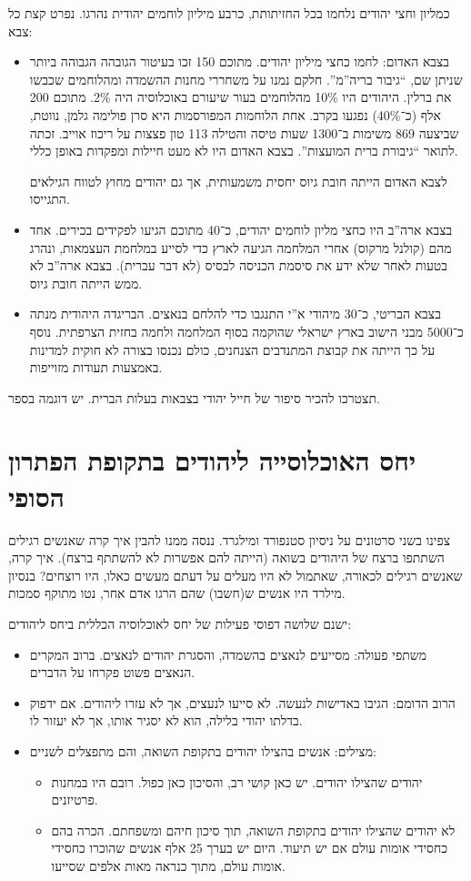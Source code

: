 \documentclass[a4paper]{book}
\begin{document}
	כמליון וחצי יהודים נלחמו בכל החזיתותת, כרבע מיליון לוחמים יהודית נהרגו. נפרט קצת כל צבא: 
	\begin{itemize}
		\item בצבא האדום: לחמו כחצי מיליון יהודים. מתוכם 150 זכו בעיטור הגובהה הגבוהה ביותר שניתן שם, ``גיבור בריה''מ''. חלקם נמנו על משחררי מחנות ההשמדה ומהלוחמים שכבשו את ברלין. היהודים היו 10\% מהלוחמים בעור שיעורם באוכלוסיה היה 2\%. מתוכם 200 אלף (כ־40\%) נפגעו בקרב. אחת הלוחמות המפורסמות היא סרן פולימה גלמן, נווטת, שביצעה 869 משימות ב־1300 שעות טיסה והטילה 113 טון פצצות על ריכוז אוייב. זכתה לתואר ``גיבורת ברית המועצות''. בצבא האדום היו לא מעט חיילות ומפקדות באופן כללי. 
		
		לצבא האדום הייתה חובת גיוס יחסית משמעותית, אך גם יהודים מחוץ לטווח הגילאים התגייסו. 
		
		\item בצבא ארה''ב היו כחצי מליון לוחמים יהודים, כ־40 מתוכם הגיעו לפקידים בכירים. אחד מהם (קולנל מרקוס) אחרי המלחמה הגיעה לארץ כדי לסייע במלחמת העצמאות, ונהרג בטעות לאחר שלא ידע את סיסמת הכניסה לבסיס (לא דבר עברית). בצבא ארה''ב לא ממש הייתה חובת גיוס. 
		\item בצבא הבריטי, כ־30 מיהודי א''י התנגבו כדי להלחם בנאצים. הבריגדה היהודית מנתה כ־5000 מבני הישוב בארץ ישראלי שהוקמה בסוף המלחמה ולחמה בחזית הצרפתית. נוסף על כך הייתה את קבוצת המתנדבים הצנחנים, כולם נכנסו בצורה לא חוקית למדינות באמצעות תעודות מזוייפות. 
	\end{itemize}
	
	תצטרכו להכיר סיפור של חייל יהודי בצבאות בעלות הברית. יש דוגמה בספר. 
	
	\section{יחס האוכלוסייה ליהודים בתקופת הפתרון הסופי}
	צפינו בשני סרטונים על ניסיון סטנפורד ומילגרד. ננסה ממנו להבין איך קרה שאנשים רגילים השתתפו ברצח של היהודים בשואה (הייתה להם אפשרות לא להשתתף ברצח). איך קרה, שאנשים רגילים לכאורה, שאתמול לא היו מעלים על דעתם מעשים כאלו, היו רוצחים? בנסיון מילרד היו אנשים ש(חשבו) שהם הרגו אדם אחר, נטו מתוקף סמכות. 
	
	ישנם שלושה דפוסי פעילות של יחס לאוכלוסיה הכללית ביחס ליהודים: 
	\begin{itemize}
		\item משתפי פעולה: מסייעים לנאצים בהשמדה, והסגרת יהודים לנאצים. ברוב המקרים הנאצים פשוט פקרחו על הדברים. 
		\item הרוב הדומם: הגיבו באדישות לנעשה. לא סייעו לנעצים, אך לא עזרו ליהודים. אם ידפוק בדלתו יהודי בלילה, הוא לא יסגיר אותו, אך לא יעזור לו. 
		\item מצילים: אנשים בהצילו יהודים בתקופת השואה, והם מתפצלים לשניים: 
		\begin{itemize}
			\item יהודים שהצילו יהודים. יש כאן קושי רב, והסיכון כאן כפול. רובם היו במחנות פרטיזנים. 
			\item לא יהודים שהצילו יהודים בתקופת השואה, תוך סיכון חיהם ומשפחתם. הכרה בהם כחסידי אומות עולם אם יש תיעוד. היום יש בערך 25 אלף אנשים שהוכרו כחסידי אומות עולם, מתוך כנראה מאות אלפים שסייעו. 
		\end{itemize}
	\end{itemize}
	
\end{document}
